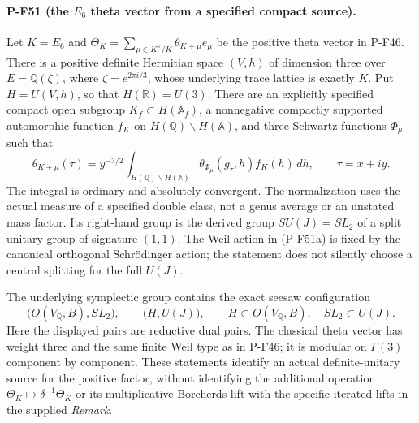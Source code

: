 \documentclass[11pt,a4paper]{article}
\begin{document}
\paragraph{P-F51 (the $E_6$ theta vector from a specified compact source).}
Let $K=E_6$ and $\Theta_K=\sum_{\mu\in K^\vee/K}
\theta_{K+\mu}e_\mu$ be the positive theta vector in P-F46.
There is a positive definite Hermitian space $(V,h)$ of
dimension three over $E=\mathbb Q(\zeta)$, where
$\zeta=e^{2\pi i/3}$, whose underlying trace lattice is
exactly $K$. Put $H=U(V,h)$, so that $H(\mathbb R)=U(3)$.
There are an explicitly specified compact open subgroup
$K_f\subset H(\mathbb A_f)$, a nonnegative compactly
supported automorphic function $f_K$ on
$H(\mathbb Q)\backslash H(\mathbb A)$, and three
Schwartz functions $\Phi_\mu$ such that
\[
 \theta_{K+\mu}(\tau)
   =y^{-3/2}\int_{H(\mathbb Q)\backslash H(\mathbb A)}
       \theta_{\Phi_\mu}(g_\tau,h) f_K(h)\,dh,
 \qquad \tau=x+iy.
 \tag{P-F51a}
\]
The integral is ordinary and absolutely convergent.
The normalization uses the actual measure of a specified
double class, not a genus average or an unstated mass factor.
Its right-hand group is the derived group
$SU(J)=SL_2$ of a split unitary group of signature $(1,1)$.
The Weil action in (P-F51a) is fixed by the canonical
orthogonal Schr\"odinger action; the statement does not
silently choose a central splitting for the full $U(J)$.

The underlying symplectic group contains the exact
seesaw configuration
\[
 \bigl(O(V_{\mathbb Q},B),SL_2\bigr),\qquad
 \bigl(H,U(J)\bigr),\qquad
 H\subset O(V_{\mathbb Q},B),\quad SL_2\subset U(J).
 \tag{P-F51b}
\]
Here the displayed pairs are reductive dual pairs.
The classical theta vector has weight three and the
same finite Weil type as in P-F46; it is modular on
$\Gamma(3)$ component by component. These statements
identify an actual definite-unitary source for the
positive factor, without identifying the additional
operation $\Theta_K\mapsto\delta^{-1}\Theta_K$ or its
multiplicative Borcherds lift with the specific iterated
lifts in the supplied \emph{Remark}.
\end{document}
